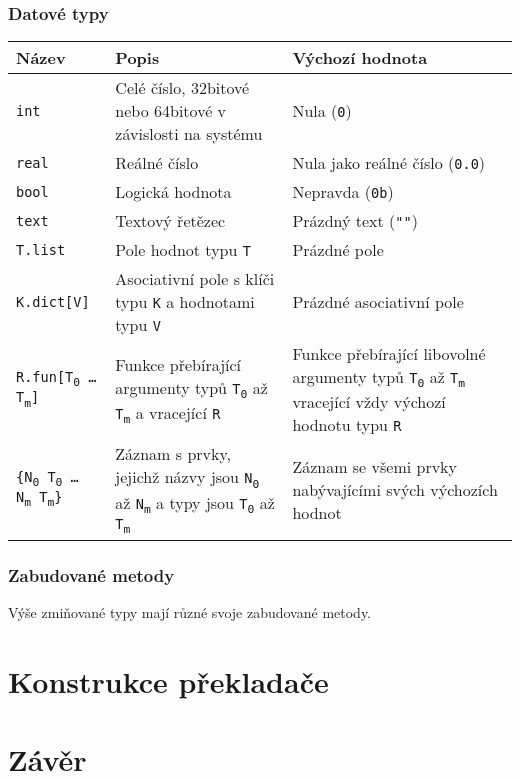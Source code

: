 \documentclass[a4paper,12pt]{article}
\def\quote #1{"#1"}
\begin{document}
\subsubsection{Datové typy}
\begin{tabular}{|m{3.5cm} m{6cm} m{5cm}|}\hline
Název & Popis & Výchozí hodnota \\\hline
\texttt{int} & Celé číslo, 32bitové nebo 64bitové v závislosti na systému & Nula (\texttt{0})\\\hline
\texttt{real} & Reálné číslo & Nula jako reálné číslo (\texttt{0.0})\\\hline
\texttt{bool} & Logická hodnota & Nepravda (\texttt{0b})\\\hline
\texttt{text} & Textový řetězec & Prázdný text (\texttt{\quote{}})\\\hline
\texttt{T.list} & Pole hodnot typu \texttt{T} & Prázdné pole\\\hline
\texttt{K.dict[V]} & Asociativní pole s klíči typu \texttt{K} a hodnotami typu \texttt{V} & Prázdné asociativní pole\\\hline
\texttt{R.fun[T\textsubscript{0} \ldots{} T\textsubscript{m}]} & Funkce přebírající argumenty typů \texttt{T\textsubscript{0}} až \texttt{T\textsubscript{m}} a vracející \texttt{R} & Funkce přebírající libovolné argumenty typů \texttt{T\textsubscript{0}} až \texttt{T\textsubscript{m}} vracející vždy výchozí hodnotu typu \texttt{R}\\\hline
\texttt{\{N\textsubscript{0} T\textsubscript{0} \ldots{} N\textsubscript{m} T\textsubscript{m}\}} & Záznam s prvky, jejichž názvy jsou \texttt{N\textsubscript{0}} až \texttt{N\textsubscript{m}} a typy jsou \texttt{T\textsubscript{0}} až \texttt{T\textsubscript{m}} & Záznam se všemi prvky nabývajícími svých výchozích hodnot\\\hline
\end{tabular}

\subsubsection{Zabudované metody}
Výše zmiňované typy mají různé svoje zabudované metody.

\section{Konstrukce překladače}

\section{Závěr}

\newpage
\printbibliography[heading=bibintoc, title={Použitá literatura}]
\newpage
\end{document}
